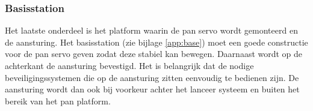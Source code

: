 \subsubsection{Basisstation}

Het laatste onderdeel is het platform waarin de pan servo wordt gemonteerd en de aansturing. Het
basisstation (zie bijlage \ref{app:base}) moet een goede constructie voor de pan servo geven zodat deze stabiel
kan bewegen. Daarnaast wordt op de achterkant de aansturing bevestigd. Het is belangrijk dat de
nodige beveiligingssystemen die op de aansturing zitten eenvoudig te bedienen zijn. De aansturing
wordt dan ook bij voorkeur achter het lanceer systeem en buiten het bereik van het pan platform.
